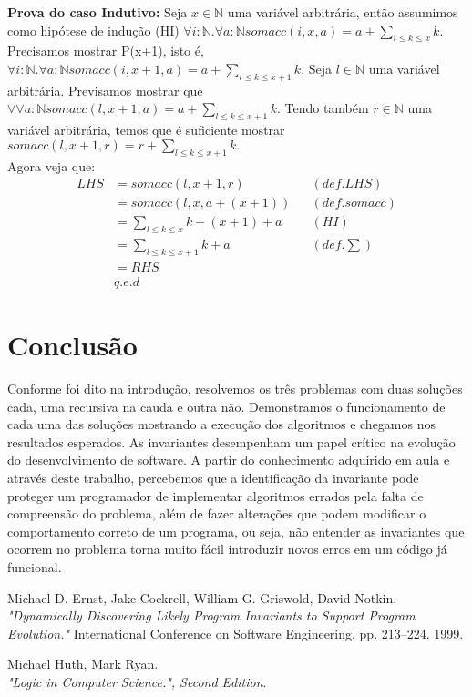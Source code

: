 \documentclass{article}
\begin{document}
\textbf{Prova do caso Indutivo:} Seja $x \in \mathbb{N}$ uma variável arbitrária, então assumimos como hipótese
de indução (HI) $\forall i:\mathbb{N}.\forall a:\mathbb{N} somacc(i, x, a) = a + \sum\limits_{i \le k \le x} k.$
Precisamos mostrar P(x+1), isto é,
$\forall i:\mathbb{N}.\forall a:\mathbb{N} somacc(i, x+1, a) = a + \sum\limits_{i \le k \le x+1} k.$
Seja $l \in \mathbb{N}$ uma variável arbitrária. Previsamos  mostrar que
$\forall \forall a:\mathbb{N} somacc(l, x+1, a) = a + \sum\limits_{l \le k \le x+1} k.$
Tendo também $r \in \mathbb{N}$ uma variável arbitrária, temos que é suficiente mostrar
$somacc(l, x+1, r) = r + \sum\limits_{l \le k \le x+1} k.$\\
Agora veja que:
\begin{align*}
LHS &= somacc(l, x+1, r) && (def. LHS)\\
&= somacc(l, x, a+(x+1)) && (def. somacc)\\
&= \sum\limits_{l \le k \le x} k + (x+1) + a && (HI)\\
&= \sum\limits_{l \le k \le x+1} k + a && (def. \sum)\\
&= RHS\\
& q.e.d
\end{align*}
\section{Conclusão}
Conforme foi dito na introdução, resolvemos os três problemas com duas soluções cada, uma recursiva na cauda e outra não.
Demonstramos o funcionamento de cada uma das soluções mostrando a execução dos algoritmos e chegamos nos resultados esperados.
As invariantes desempenham um papel crítico na evolução do desenvolvimento de software. A partir do conhecimento
adquirido em aula e através deste trabalho, percebemos que a identificação da invariante pode proteger um programador
de implementar algoritmos errados pela falta de compreensão do problema, além de fazer alterações que podem modificar o
comportamento correto de um programa, ou seja, não entender as invariantes que ocorrem
no problema torna muito fácil introduzir novos erros em um código já funcional.

\begin{thebibliography}{9}
	Michael D. Ernst, Jake Cockrell, William G. Griswold, David Notkin.\\
	\emph{"Dynamically Discovering Likely Program Invariants to Support Program Evolution."}
	International Conference on Software Engineering, pp. 213–224. 1999.

	Michael Huth, Mark Ryan.\\
	\emph{"Logic in Computer Science.", Second Edition}.
\end{thebibliography}
\end{document}
